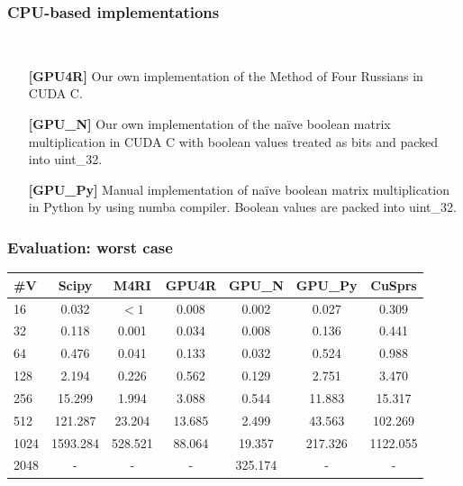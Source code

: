 \documentclass[xcolor=table]{beamer}
\newcommand{\ltz}{$< 1$}
\begin{document}
\begin{frame}[fragile] \frametitle{CPU-based implementations}
  \begin{minipage}[t]{1cm}
\hspace{1cm}
  \end{minipage}
  ~
\begin{minipage}[t]{0.85\textwidth}
\begin{itemize}
\item[\textbf{[GPU4R]}] Our own implementation of the Method of Four
Russians in CUDA C.
\pause
\item[\textbf{[GPU\_N]}] Our own implementation of the na\"ive boolean
matrix multiplication in CUDA C with boolean values treated
as bits and packed into uint\_32.
\pause
\item[\textbf{[GPU\_Py]}] Manual implementation of na\"ive boolean matrix
multiplication in Python by using numba compiler. Boolean
values are packed into uint\_32.
\end{itemize}
\end{minipage}
\end{frame}


\begin{frame} \frametitle{Evaluation: worst case}
  \begin{centering}
  \begin{tabular}{| l | c | c | c | c | c | c | }
      \hline
      \#V  & Scipy    & M4RI    & GPU4R  & GPU\_N  & GPU\_Py & CuSprs   \\
      \hline
      \hline
      16   & 0.032    & \ltz    & 0.008  & 0.002   & 0.027   & 0.309    \\
      32   & 0.118    & 0.001   & 0.034  & 0.008   & 0.136   & 0.441    \\
      64   & 0.476    & 0.041   & 0.133  & 0.032   & 0.524   & 0.988    \\
      128  & 2.194    & 0.226   & 0.562  & 0.129   & 2.751   & 3.470    \\
      256  & 15.299   & 1.994   & 3.088  & 0.544   & 11.883  & 15.317   \\
      512  & 121.287  & 23.204  & 13.685 & 2.499   & 43.563  & 102.269  \\
      1024 & 1593.284 & 528.521 & 88.064 & 19.357  & 217.326 & 1122.055 \\
      2048 & -        & -       & -      & 325.174 & -       & -        \\
      \hline
    \end{tabular}
  \end{centering}
\end{frame}
\end{document}
